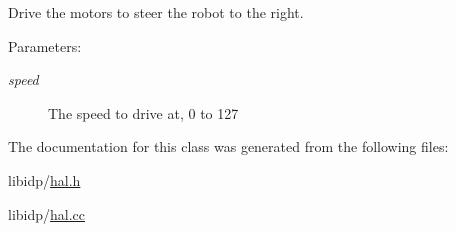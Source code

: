Drive the motors to steer the robot to the right. \begin{Desc}
\item[Parameters:]
\begin{description}
\item[{\em speed}]The speed to drive at, 0 to 127 \end{description}
\end{Desc}


The documentation for this class was generated from the following files:\begin{CompactItemize}
\item 
libidp/\hyperlink{hal_8h}{hal.h}\item 
libidp/\hyperlink{hal_8cc}{hal.cc}\end{CompactItemize}

